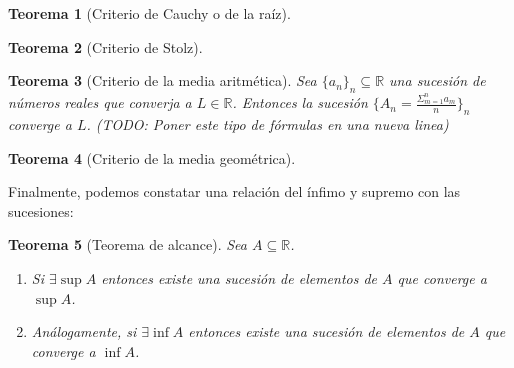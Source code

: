\documentclass{article}
\newtheorem{theorem}{Teorema}
\newcommand{\reales}{\mathbb{R}}
\newcommand{\sucreal}[1]{\{ #1 _n \}_n \subseteq \reales}
\begin{document}
\begin{theorem}[Criterio de Cauchy o de la raíz]

\end{theorem}

\begin{theorem}[Criterio de Stolz]

\end{theorem}

\begin{theorem}[Criterio de la media aritmética]
	Sea $\sucreal{a}$ una sucesión de números reales que converja a $L \in \reales$. Entonces la sucesión $\{ A_n = \frac{\Sigma_{m=1}^{n} a_m}{n} \}_n$ converge a $L$. (TODO: Poner este tipo de fórmulas en una nueva linea)
\end{theorem}

\begin{theorem}[Criterio de la media geométrica]

\end{theorem}

Finalmente, podemos constatar una relación del ínfimo y supremo con las sucesiones:

\begin{theorem}[Teorema de alcance]
	Sea $A \subseteq \reales$. 
\begin{enumerate}
\item
	Si $\exists \sup A$ entonces existe una sucesión de elementos de $A$ que converge a $\sup A$.
\item
	Análogamente, si $\exists \inf A$ entonces existe una sucesión de elementos de $A$ que converge a $\inf A$.
\end{enumerate}	

\end{theorem}
\end{document}
